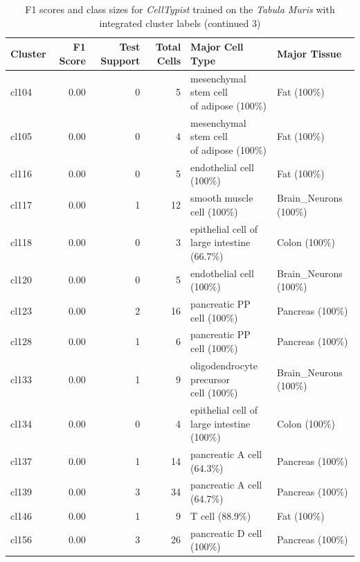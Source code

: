\begin{table}[ht!]
\scriptsize
\caption[F1 scores and class sizes for \textit{CellTypist} trained on the \textit{Tabula Muris} with integrated cluster labels (continued 3)]{F1 scores and class sizes for \textit{CellTypist} trained on the \textit{Tabula Muris} with integrated cluster labels (continued 3)}
\centering
\label{table:tab_tmmodelclust3}
\begin{tabular}{lrrrll}
  \toprule
Cluster & F1 Score & Test Support & Total Cells & Major Cell Type & Major Tissue \\
  \midrule
  cl104 & 0.00 &   0 &   5 & \specialcell[t]{mesenchymal stem cell\\of adipose (100\%)} & Fat (100\%) \\ 
  cl105 & 0.00 &   0 &   4 & \specialcell[t]{mesenchymal stem cell\\of adipose (100\%)} & Fat (100\%) \\ 
  cl116 & 0.00 &   0 &   5 & endothelial cell (100\%) & Fat (100\%) \\ 
  cl117 & 0.00 &   1 &  12 & smooth muscle cell (100\%) & Brain\_Neurons (100\%) \\ 
  cl118 & 0.00 &   0 &   3 & \specialcell[t]{epithelial cell of\\large intestine (66.7\%)} & Colon (100\%) \\ 
  cl120 & 0.00 &   0 &   5 & endothelial cell (100\%) & Brain\_Neurons (100\%) \\ 
  cl123 & 0.00 &   2 &  16 & pancreatic PP cell (100\%) & Pancreas (100\%) \\ 
  cl128 & 0.00 &   1 &   6 & pancreatic PP cell (100\%) & Pancreas (100\%) \\ 
  cl133 & 0.00 &   1 &   9 & \specialcell[t]{oligodendrocyte precursor\\cell (100\%)} & Brain\_Neurons (100\%) \\ 
  cl134 & 0.00 &   0 &   4 & \specialcell[t]{epithelial cell of\\large intestine (100\%)} & Colon (100\%) \\ 
  cl137 & 0.00 &   1 &  14 & pancreatic A cell (64.3\%) & Pancreas (100\%) \\ 
  cl139 & 0.00 &   3 &  34 & pancreatic A cell (64.7\%) & Pancreas (100\%) \\ 
  cl146 & 0.00 &   1 &   9 & T cell (88.9\%) & Fat (100\%) \\ 
  cl156 & 0.00 &   3 &  26 & pancreatic D cell (100\%) & Pancreas (100\%) \\ 

\end{tabular}
\end{table}
